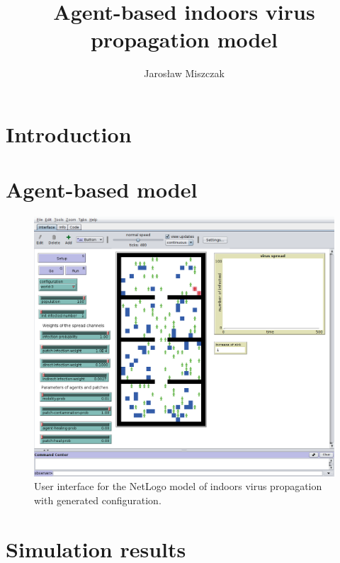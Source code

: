 \documentclass[11pt,a4paper]{article}
\title{Agent-based indoors virus propagation model}
\author{Jarosław Miszczak}
\begin{document}
\maketitle

\section{Introduction}


\section{Agent-based model}

\begin{figure}[ht!]
\includegraphics[width=\textwidth]{plots/model-gui.png}
\caption{User interface for the NetLogo model of indoors virus propagation with generated configuration.}
\label{fig:gui-world-3}
\end{figure}


\section{Simulation results}
\end{document}
